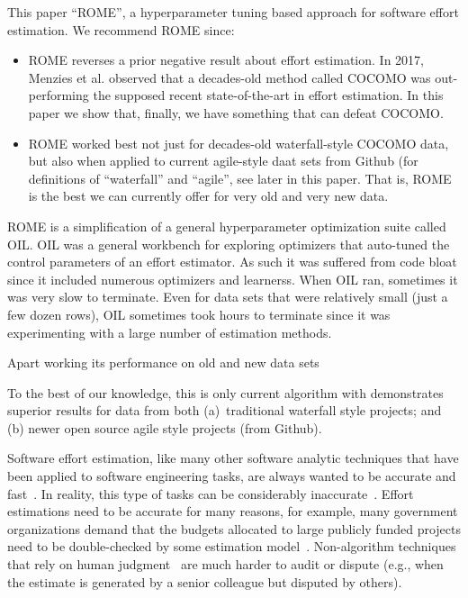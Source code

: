 \documentclass[sigconf,review,anonymous]{acmart}
\newcommand{\bi}{\begin{itemize}}
\newcommand{\ei}{\end{itemize}}
\begin{document}
This paper  ``ROME'', a hyperparameter tuning based approach for software effort estimation. We recommend ROME since:
\bi
\item
ROME reverses
a prior negative result about effort estimation. In 2017, Menzies et al. observed that  a decades-old method
called COCOMO was out-performing the supposed recent state-of-the-art in effort estimation. In this paper we show that,
finally, we have something that can defeat COCOMO.
\item
ROME worked best not just for decades-old waterfall-style COCOMO data, but also when applied to current agile-style daat sets from Github (for definitions
of ``waterfall'' and ``agile'', see later in this paper.
That is, ROME is the best we can currently offer for very old and very new data.
\ei
ROME is a simplification of a general hyperparameter optimization suite called OIL. OIL was a general 
workbench for exploring optimizers that auto-tuned the control parameters of an effort estimator.
As such it was suffered from code bloat since it included numerous optimizers and learnerss. 
When OIL ran, sometimes it was very slow to terminate. Even for data sets that were relatively
small (just a few dozen rows), OIL sometimes took hours to terminate since it was experimenting with a large number of estimation methods. 

Apart working its performance on old and new data sets

To the best of our knowledge, this
is only current algorithm with demonstrates superior results for data from both (a)~traditional waterfall style projects;
and (b) newer  open source agile style projects (from Github).


Software effort estimation, like many other software analytic techniques that have been applied to software engineering tasks, are always wanted to be accurate and fast~\cite{menzies2018software,nam2018heterogeneous}. 
In reality, this type of tasks can be 
considerably inaccurate~\cite{kemerer1987empirical}.  Effort estimations need to be accurate for many reasons, for example, many government organizations demand that the budgets allocated to large publicly funded projects need to be double-checked by some estimation model~\cite{MenziesNeg:2017}.  
Non-algorithm techniques that rely on human judgment~\cite{jorgensen2004review} are much harder to  
audit or 
dispute (e.g.,  when the estimate is generated by a senior colleague but disputed by others). 
\end{document}
